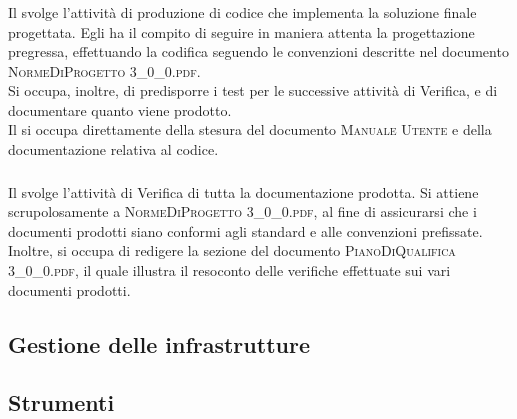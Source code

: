 		\subsubsection{\Progr}
		Il \textit{\Progr} svolge l'attività di produzione di codice che implementa la soluzione finale progettata. Egli ha il compito di seguire in maniera attenta la progettazione pregressa, effettuando la codifica seguendo le convenzioni descritte nel documento \textsc{NormeDiProgetto 3\_0\_0.pdf}.\\
		Si occupa, inoltre, di predisporre i test per le successive attività di Verifica, e di documentare quanto viene prodotto.\\
		Il \textit{\Progr} si occupa direttamente della stesura del documento \textsc{Manuale Utente} e della documentazione relativa al codice.
		
		\subsubsection{\Ver}
		Il \textit{\Ver} svolge l'attività di Verifica di tutta la documentazione prodotta. Si attiene scrupolosamente a \textsc{NormeDiProgetto 3\_0\_0.pdf}, al fine di assicurarsi che i documenti prodotti siano conformi agli standard e alle convenzioni prefissate.\\
		Inoltre, si occupa di redigere la sezione del documento \textsc{PianoDiQualifica 3\_0\_0.pdf}, il quale illustra il resoconto delle verifiche effettuate sui vari documenti prodotti.

	
	\subsection{Gestione delle infrastrutture}
	

	\subsection{Strumenti}

